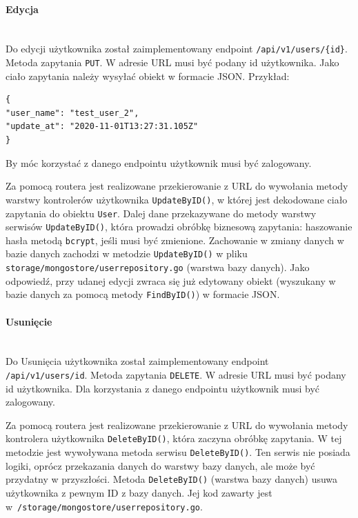 % 
\paragraph{Edycja}\mbox{}\\
Do edycji użytkownika został zaimplementowany endpoint \texttt{/api/v1/users/\{id\}}.
Metoda zapytania \texttt{PUT}.
W adresie URL musi być podany id użytkownika.
Jako ciało zapytania należy wysyłać obiekt w formacie JSON. Przykład:
\begin{lstlisting}[basicstyle=\tiny\ttfamily]
{
"user_name": "test_user_2",
"update_at": "2020-11-01T13:27:31.105Z"
}
\end{lstlisting}
By móc korzystać z danego endpointu użytkownik musi być zalogowany.

Za pomocą routera jest realizowane przekierowanie z URL do wywołania metody warstwy kontrolerów użytkownika \texttt{UpdateByID()}, w której jest dekodowane ciało zapytania do obiektu \texttt{User}.
Dalej dane przekazywane do metody warstwy serwisów \texttt{UpdateByID()}, która prowadzi obróbkę biznesową zapytania: haszowanie hasła metodą \texttt{bcrypt}, jeśli musi być zmienione.
Zachowanie w zmiany danych w bazie danych zachodzi w metodzie \texttt{UpdateByID()} w pliku \texttt{storage/mongostore/userrepository.go} (warstwa bazy danych).
Jako odpowiedź, przy udanej edycji zwraca się już edytowany obiekt (wyszukany w bazie danych za pomocą metody \texttt{FindByID()}) w formacie JSON.
\paragraph{Usunięcie}\mbox{}\\
Do Usunięcia użytkownika został zaimplementowany endpoint \texttt{/api/v1/users/{id}}.
Metoda zapytania \texttt{DELETE}.
W adresie URL musi być podany id użytkownika.
Dla korzystania z danego endpointu użytkownik musi być zalogowany.

Za pomocą routera jest realizowane przekierowanie z URL do wywołania metody kontrolera użytkownika \texttt{DeleteByID()}, która zaczyna obróbkę zapytania.
W tej metodzie jest wywoływana metoda serwisu \texttt{DeleteByID()}. Ten serwis nie posiada logiki, oprócz przekazania danych do warstwy bazy danych, ale może być przydatny w przyszłości.
Metoda \texttt{DeleteByID()} (warstwa bazy danych) usuwa użytkownika z pewnym ID z bazy danych.
Jej kod zawarty jest w~\texttt{/storage/mongostore/userrepository.go}.

